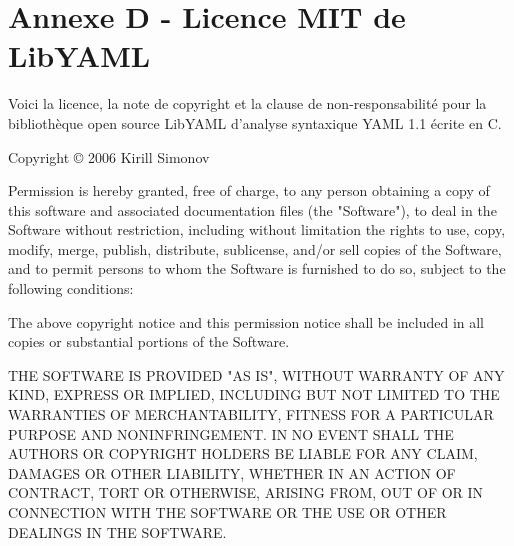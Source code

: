 \chapter*{Annexe D - Licence MIT de LibYAML}
\noindent  Voici la licence, la note de copyright et la clause de non-responsabilité pour la
bibliothèque open source LibYAML d'analyse syntaxique YAML 1.1 écrite en C.

\bigskip
\noindent Copyright © 2006 Kirill Simonov

\bigskip
\noindent Permission is hereby granted, free of charge, to any person obtaining a copy of
this software and associated documentation files (the "Software"), to deal in
the Software without restriction, including without limitation the rights to
use, copy, modify, merge, publish, distribute, sublicense, and/or sell copies
of the Software, and to permit persons to whom the Software is furnished to do
so, subject to the following conditions:

\bigskip
\noindent The above copyright notice and this permission notice shall be included in all
copies or substantial portions of the Software.

\bigskip
\noindent THE SOFTWARE IS PROVIDED "AS IS", WITHOUT WARRANTY OF ANY KIND, EXPRESS OR
IMPLIED, INCLUDING BUT NOT LIMITED TO THE WARRANTIES OF MERCHANTABILITY,
FITNESS FOR A PARTICULAR PURPOSE AND NONINFRINGEMENT. IN NO EVENT SHALL THE
AUTHORS OR COPYRIGHT HOLDERS BE LIABLE FOR ANY CLAIM, DAMAGES OR OTHER
LIABILITY, WHETHER IN AN ACTION OF CONTRACT, TORT OR OTHERWISE, ARISING FROM,
OUT OF OR IN CONNECTION WITH THE SOFTWARE OR THE USE OR OTHER DEALINGS IN THE
SOFTWARE.

